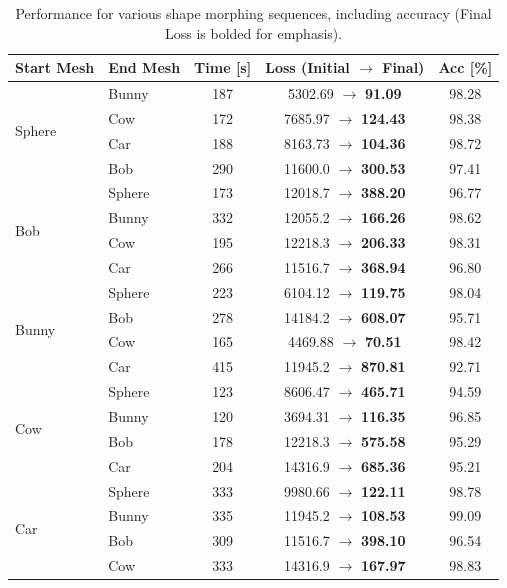 \begin{table}[ht!]
  \scriptsize
  \caption{Performance for various shape morphing sequences, including accuracy (Final Loss is bolded for emphasis).}
  \centering
  \begin{tabular}{llccc}
    \toprule
    \textbf{Start Mesh} & \textbf{End Mesh} 
    & \textbf{Time [s]} & \textbf{Loss (Initial $\rightarrow$ \textbf{Final})} & \textbf{Acc [\%]} \\
    \midrule
    \multirow{4}{*}{Sphere}
      & Bunny & 187 & 5302.69 $\rightarrow$ \textbf{91.09} & 98.28 \\
      & Cow  & 172 & 7685.97 $\rightarrow$ \textbf{124.43} & 98.38 \\
      & Car   & 188 & 8163.73 $\rightarrow$ \textbf{104.36} & 98.72 \\
      & Bob   & 290 & 11600.0 $\rightarrow$ \textbf{300.53} & 97.41 \\
    \midrule
    \multirow{4}{*}{Bob}
      & Sphere & 173 & 12018.7 $\rightarrow$ \textbf{388.20} & 96.77 \\
      & Bunny  & 332 & 12055.2 $\rightarrow$ \textbf{166.26} & 98.62 \\
      & Cow   & 195 & 12218.3 $\rightarrow$ \textbf{206.33} & 98.31 \\
      & Car    & 266 & 11516.7 $\rightarrow$ \textbf{368.94} & 96.80 \\
    \midrule
    \multirow{4}{*}{Bunny}
      & Sphere & 223 & 6104.12 $\rightarrow$ \textbf{119.75} & 98.04 \\
      & Bob    & 278 & 14184.2 $\rightarrow$ \textbf{608.07} & 95.71 \\
      & Cow   & 165 & 4469.88 $\rightarrow$ \textbf{70.51} & 98.42 \\
      & Car    & 415 & 11945.2 $\rightarrow$ \textbf{870.81} & 92.71 \\
    \midrule
    \multirow{4}{*}{Cow}
      & Sphere & 123 & 8606.47 $\rightarrow$ \textbf{465.71} & 94.59 \\
      & Bunny  & 120 & 3694.31 $\rightarrow$ \textbf{116.35} & 96.85 \\
      & Bob    & 178 & 12218.3 $\rightarrow$ \textbf{575.58} & 95.29 \\
      & Car    & 204 & 14316.9 $\rightarrow$ \textbf{685.36} & 95.21 \\
    \midrule
    \multirow{4}{*}{Car}
      & Sphere & 333 & 9980.66 $\rightarrow$ \textbf{122.11} & 98.78 \\
      & Bunny  & 335 & 11945.2 $\rightarrow$ \textbf{108.53} & 99.09 \\
      & Bob    & 309 & 11516.7 $\rightarrow$ \textbf{398.10} & 96.54 \\
      & Cow   & 333 & 14316.9 $\rightarrow$ \textbf{167.97} & 98.83 \\
    \bottomrule
  \end{tabular}
  \label{tab:performance}
\end{table}





